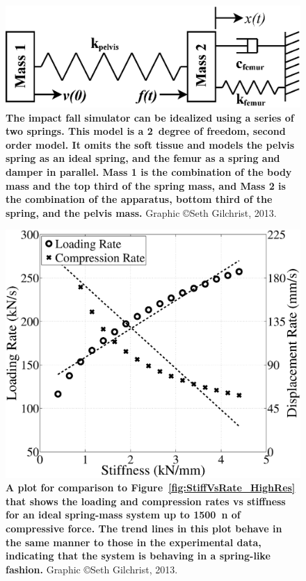 \begin{figure}
\centering
\includegraphics[width=\linewidth]{./behave_fail/Figures/ImpactModel}
\caption[Idealized model of the fall simulator]{\textbf{The impact fall simulator can be idealized using a series of two springs. This model is a 2~degree of freedom, second order model. It omits the soft tissue and models the pelvis spring as an ideal spring, and the femur as a spring and damper in parallel. Mass 1 is the combination of the body mass and the top third of the spring mass, and Mass 2 is the combination of the apparatus, bottom third of the spring, and the pelvis mass.} Graphic \copyright Seth Gilchrist, 2013.}
\label{fig:ImpactModel}
\end{figure}

\begin{figure}
\centering
\includegraphics[width=0.7\linewidth]{./behave_fail/Figures/stiffVsRatesIdeal}
\caption[Ideal loading and compression rates \acs*{vs} stiffness]{\textbf{A plot for comparison to Figure~\ref{fig:StiffVsRate_HighRes} that shows the loading and compression rates \ac{vs} stiffness for an ideal spring-mass system up to 1500~\ac{n} of compressive force. The trend lines in this plot behave in the same manner to those in the experimental data, indicating that the system is behaving in a spring-like fashion.} Graphic \copyright Seth Gilchrist, 2013.}
\label{fig:stiffVsRatesIdeal}
\end{figure}

